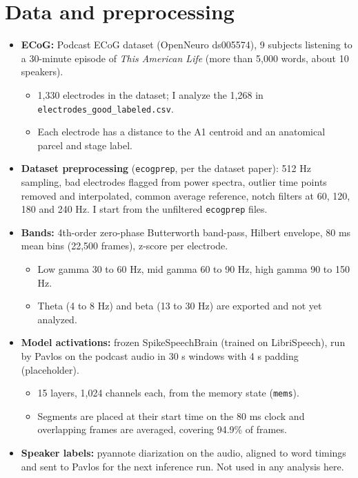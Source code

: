 \documentclass[11pt]{article}
\begin{document}
\section{Data and preprocessing}
\begin{itemize}
  \item \textbf{ECoG:} Podcast ECoG dataset (OpenNeuro ds005574), 9 subjects listening to a 30-minute episode of \emph{This American Life} (more than 5,000 words, about 10 speakers).
  \begin{itemize}
    \item 1,330 electrodes in the dataset; I analyze the 1,268 in \texttt{electrodes\_good\_labeled.csv}.
    \item Each electrode has a distance to the A1 centroid and an anatomical parcel and stage label.
  \end{itemize}
  \item \textbf{Dataset preprocessing} (\texttt{ecogprep}, per the dataset paper): 512 Hz sampling, bad electrodes flagged from power spectra, outlier time points removed and interpolated, common average reference, notch filters at 60, 120, 180 and 240 Hz. I start from the unfiltered \texttt{ecogprep} files.
  \item \textbf{Bands:} 4th-order zero-phase Butterworth band-pass, Hilbert envelope, 80 ms mean bins (22,500 frames), z-score per electrode.
  \begin{itemize}
    \item Low gamma 30 to 60 Hz, mid gamma 60 to 90 Hz, high gamma 90 to 150 Hz.
    \item Theta (4 to 8 Hz) and beta (13 to 30 Hz) are exported and not yet analyzed.
  \end{itemize}
  \item \textbf{Model activations:} frozen SpikeSpeechBrain (trained on LibriSpeech), run by Pavlos on the podcast audio in 30 s windows with 4 s padding (placeholder).
  \begin{itemize}
    \item 15 layers, 1,024 channels each, from the memory state (\texttt{mems}).
    \item Segments are placed at their start time on the 80 ms clock and overlapping frames are averaged, covering 94.9\% of frames.
  \end{itemize}
  \item \textbf{Speaker labels:} pyannote diarization on the audio, aligned to word timings and sent to Pavlos for the next inference run. Not used in any analysis here.
\end{itemize}
\end{document}
